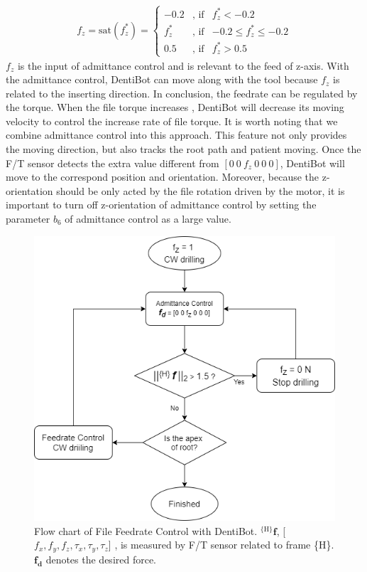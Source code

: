 \begin{equation}
\begin{split}
f_z = 
\text{sat}(f^*_z)
=
\left\{\begin{matrix}
 -0.2  &\text{, if} &f^*_z < -0.2  \\
f^*_z  &\text{, if} &-0.2 \leq  f^*_z \leq -0.2    \\
0.5    &\text{, if} &f^*_z > 0.5 
\end{matrix}\right.
\end{split}
\end{equation}
$f_z$ is the input of admittance control and is relevant to  the feed of z-axis. With the admittance control, DentiBot can move along with the tool because $f_z$ is related to the inserting direction. In conclusion, the feedrate can be regulated by the torque. When the file torque increases , DentiBot will decrease its moving velocity to control the increase rate of file torque.  It is worth noting that we combine admittance control into this approach. This feature not only provides the moving direction, but also tracks the root path and patient moving. Once the F/T sensor detects the extra value different from $[0\ 0\ f_z\ 0\ 0\ 0]$, DentiBot will move to the correspond position and orientation. Moreover, because the z-orientation should be only acted by the file rotation driven by the motor, it is important to turn off z-orientation of admittance control by setting the parameter $b_6$ of admittance control as a large value.
\begin{figure}[htbp]
\begin{center}
\includegraphics[width= 0.8\linewidth]{Images/feedrate_control_flow_chart.png}
\caption{Flow chart of File Feedrate Control with DentiBot. $^{\mathrm{\lbrace H \rbrace}}\!\boldsymbol{f}$, [$f_x, f_y, f_z,\tau _x, \tau _y, \tau _z$] , is measured by F/T sensor related to frame \{H\}. $\boldsymbol{f_d}$ denotes the desired force.
}\label{fig: feedrate_control_fc}
\end{center}
\end{figure}
